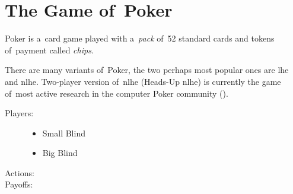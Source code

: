 \section{The Game of~Poker}
\label{sec:Poker}
Poker is a~card game played with a~\emph{pack} of~52 standard cards\footnotemark{} and tokens of~payment called \emph{chips}.

There are many variants of~Poker, the two perhaps most popular ones are \acrfull{lhe} and \acrfull{nlhe}.
Two-player version of~\acrshort{nlhe} (Heads-Up \acrshort{nlhe}) is currently the game of~most active research in the computer Poker community (\cite{Ganzfried2015endgame}).

\begin{description}
  \item [Players:] \todo
    \begin{itemize}
      \item Small Blind
      \item Big Blind
    \end{itemize}

  \item [Actions:] \todo

  \item [Payoffs:] \todo 
\end{description}
\todo

